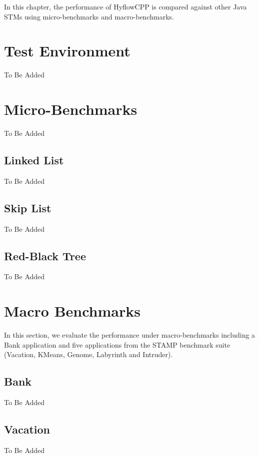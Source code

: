 \documentclass[12pt,english]{report}
\begin{document}
In this chapter, the performance of HyflowCPP is compared against other Java STMs using micro-benchmarks and macro-benchmarks.

\section{Test Environment}

To Be Added

\section{Micro-Benchmarks}

To Be Added 

\subsection{Linked List\label{sub:Linked-List}}

To Be Added 

\subsection{Skip List}

To Be Added 

\subsection{Red-Black Tree}

To Be Added 

\section{Macro Benchmarks}

In this section, we evaluate the performance under macro-benchmarks including a Bank application and five applications from the STAMP benchmark suite~\cite{caominh:stamp:iiswc:2008} (Vacation, KMeans, Genome,
Labyrinth and Intruder).

\subsection{Bank}

To Be Added

\subsection{Vacation}

To Be Added
\end{document}
